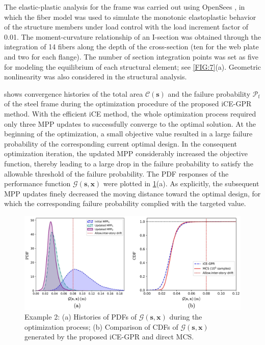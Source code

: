 \documentclass[preprint,3p]{elsarticle}
\begin{document}
\begin{linenumbers}
The elastic-plastic analysis for the frame was carried out using OpenSees \cite{PEERC2020}, in which the ﬁber model was used to simulate the monotonic elastoplastic behavior of the structure members under load control with the load increment factor of 0.01. The moment-curvature relationship of an I-section was obtained through the integration of 14 fibers along the depth of the cross-section (ten for the web plate and two for each flange). The number of section integration points was set as five for modeling the equilibrium of each structural element; see \cref{FIG:7}(a). Geometric nonlinearity was also considered in the structural analysis.

 shows convergence histories of the total area $\mathcal{C}(\textbf{s})$ and the failure probability  $\mathcal{P}_\text{f}$ of the steel frame during the optimization procedure of the proposed iCE-GPR method. With the efficient iCE method, the whole optimization process required only three MPP updates to successfully converge to the optimal solution.
At the beginning of the optimization, a small objective value resulted in a large failure probability of the corresponding current optimal design. In the consequent optimization iteration, the updated MPP considerably increased the objective function, thereby leading to a large drop in the failure probability to satisfy the allowable threshold of the failure probability. The PDF responses of the performance function $\mathcal{G}(\textbf{s},\textbf{x})$ were plotted in \cref{FIG:9}(a). As explicitly, the subsequent MPP updates finely decreased the moving distance toward the optimal design, for which the corresponding failure probability complied with the targeted value.

\begin{figure}[ht]
	\begin{center}
		\includegraphics[scale=1.185]{Fig9.jpg}
	\end{center}
	\caption{Example 2: (a) Histories of PDFs of $\mathcal{G}(\textbf{s},\textbf{x})$ during the optimization process; (b) Comparison of CDFs of $\mathcal{G}(\textbf{s},\textbf{x})$ generated by the proposed iCE-GPR and direct MCS.}
	\label{FIG:9}
\end{figure}


\end{linenumbers}
\end{document}
